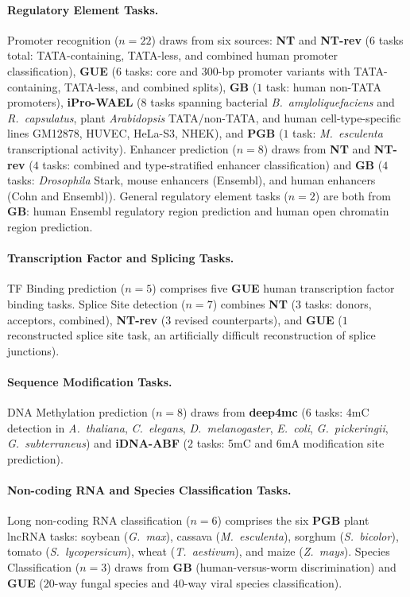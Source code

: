 \documentclass{article}
\theoremstyle{plain}
\theoremstyle{definition}
\theoremstyle{remark}
\begin{document}
\paragraph{Regulatory Element Tasks.} Promoter recognition
($n=22$) draws from six sources: \textbf{NT} and \textbf{NT-rev}
($6$ tasks total: TATA-containing, TATA-less, and combined human
promoter classification), \textbf{GUE} ($6$ tasks: core and 300-bp promoter variants with TATA-containing,
TATA-less, and combined splits), \textbf{GB} ($1$ task:
human non-TATA promoters), \textbf{iPro-WAEL} ($8$ tasks spanning
bacterial \textit{B.\ amyloliquefaciens} and
\textit{R.\ capsulatus}, plant \textit{Arabidopsis} TATA/non-TATA,
and human cell-type-specific lines GM12878, HUVEC, HeLa-S3,
NHEK), and \textbf{PGB} ($1$ task: \textit{M.\ esculenta}
transcriptional activity). Enhancer prediction ($n=8$) draws
from \textbf{NT} and \textbf{NT-rev} ($4$ tasks: combined and
type-stratified enhancer classification) and \textbf{GB}
($4$ tasks: \textit{Drosophila} Stark, mouse enhancers (Ensembl),
and human enhancers (Cohn and Ensembl)). General regulatory
element tasks ($n=2$) are both from \textbf{GB}: human Ensembl
regulatory region prediction and human open chromatin region
prediction.

\paragraph{Transcription Factor and Splicing Tasks.} TF Binding
prediction ($n=5$) comprises five \textbf{GUE} human transcription
factor binding tasks. Splice Site detection ($n=7$) combines
\textbf{NT} ($3$ tasks: donors, acceptors, combined),
\textbf{NT-rev} ($3$ revised counterparts), and \textbf{GUE}
($1$ reconstructed splice site task, an artificially difficult
reconstruction of splice junctions).

\paragraph{Sequence Modification Tasks.} DNA Methylation
prediction ($n=8$) draws from \textbf{deep4mc} ($6$ tasks: 4mC
detection in \textit{A.\ thaliana}, \textit{C.\ elegans},
\textit{D.\ melanogaster}, \textit{E.\ coli},
\textit{G.\ pickeringii}, \textit{G.\ subterraneus}) and
\textbf{iDNA-ABF} ($2$ tasks: 5mC and 6mA modification site
prediction).

\paragraph{Non-coding RNA and Species Classification Tasks.}
Long non-coding RNA classification ($n=6$) comprises the six
\textbf{PGB} plant lncRNA tasks: soybean (\textit{G.\ max}),
cassava (\textit{M.\ esculenta}), sorghum
(\textit{S.\ bicolor}), tomato (\textit{S.\ lycopersicum}),
wheat (\textit{T.\ aestivum}), and maize (\textit{Z.\ mays}).
Species Classification ($n=3$) draws from \textbf{GB}
(human-versus-worm discrimination) and \textbf{GUE} ($20$-way
fungal species and $40$-way viral species classification).
\end{document}
